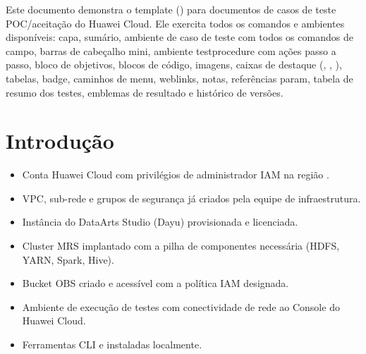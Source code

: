 \documentclass[portuguese]{testbook}
\begin{document}
\makecover

\maketoc

\startbody

\begin{infobox}
Este documento demonstra o template  () para
documentos de casos de teste POC/aceitação do Huawei Cloud. Ele exercita todos os
comandos e ambientes disponíveis: capa, sumário, ambiente de caso de teste
com todos os comandos de campo, barras de cabeçalho mini, ambiente testprocedure
com ações passo a passo, bloco de objetivos, blocos de código, imagens,
caixas de destaque (, , ), tabelas, badge,
caminhos de menu, weblinks, notas, referências param, tabela de resumo dos testes,
emblemas de resultado e histórico de versões.
\end{infobox}

\section{Introdução}

\begin{objectives}

  \prerequisites
  \begin{itemize}
    \item Conta Huawei Cloud com privilégios de administrador IAM na região .
    \item VPC, sub-rede e grupos de segurança já criados pela equipe de infraestrutura.
    \item Instância do DataArts Studio (Dayu) provisionada e licenciada.
    \item Cluster MRS implantado com a pilha de componentes necessária (HDFS, YARN, Spark, Hive).
    \item Bucket OBS criado e acessível com a política IAM designada.
    \item Ambiente de execução de testes com conectividade de rede ao Console do Huawei Cloud.
    \item Ferramentas CLI  e  instaladas localmente.
  \end{itemize}
\end{objectives}
\end{document}

